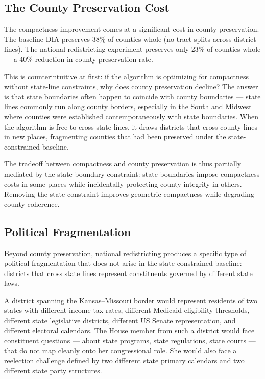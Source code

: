 \subsection{The County Preservation Cost}

The compactness improvement comes at a significant cost in county preservation.
The baseline DIA preserves 38\% of counties whole (no tract splits across
district lines).  The national redistricting experiment preserves only 23\%
of counties whole --- a 40\% reduction in county-preservation rate.

This is counterintuitive at first: if the algorithm is optimizing for
compactness without state-line constraints, why does county preservation
decline?  The answer is that state boundaries often happen to coincide with
county boundaries --- state lines commonly run along county borders, especially
in the South and Midwest where counties were established contemporaneously with
state boundaries.  When the algorithm is free to cross state lines, it draws
districts that cross county lines in new places, fragmenting counties that
had been preserved under the state-constrained baseline.

The tradeoff between compactness and county preservation is thus partially
mediated by the state-boundary constraint: state boundaries impose compactness
costs in some places while incidentally protecting county integrity in others.
Removing the state constraint improves geometric compactness while degrading
county coherence.

\subsection{Political Fragmentation}

Beyond county preservation, national redistricting produces a specific type of
political fragmentation that does not arise in the state-constrained baseline:
districts that cross state lines represent constituents governed by different
state laws.

A district spanning the Kansas--Missouri border would represent residents of
two states with different income tax rates, different Medicaid eligibility
thresholds, different state legislative districts, different US Senate
representation, and different electoral calendars.  The House member from such
a district would face constituent questions --- about state programs, state
regulations, state courts --- that do not map cleanly onto her congressional
role.  She would also face a reelection challenge defined by two different
state primary calendars and two different state party structures.

